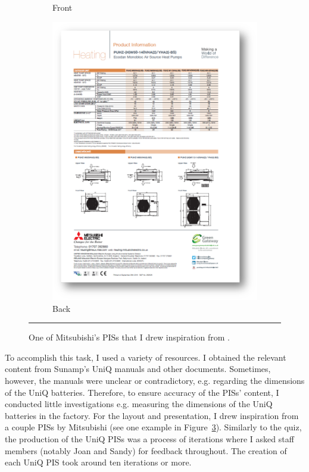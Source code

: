 \begin{figure}
\begin{subfigure}{.19\textwidth}
		\caption{Front}
		\label{mitsubishi01}
	\end{subfigure}
	\begin{subfigure}{.19\textwidth}
		\centering
		\includegraphics[width=\textwidth]{figures/Mitsubishi02.png}
		\caption{Back}
		\label{mitsubishi02}
	\end{subfigure}
	\rule{0.4\textwidth}{0.5pt} %
	\caption[Mitsubishi's PISs.]{One of Mitsubishi's PISs that I drew inspiration from \citep{ref:Mitsubishi}.}
	\label{mitsubishi}
\end{figure}

To accomplish this task, I used a variety of resources.
I obtained the relevant content from Sunamp's UniQ manuals and other documents.
Sometimes, however, the manuals were unclear or contradictory, e.g. regarding the dimensions of the UniQ batteries.
Therefore, to ensure accuracy of the PISs' content, I conducted little investigations e.g. measuring the dimensions of the UniQ batteries in the factory.
For the layout and presentation, I drew inspiration from a couple PISs by Mitsubishi (see one example in Figure~\ref{mitsubishi}).
Similarly to the quiz, the production of the UniQ PISs was a process of iterations where I asked staff members (notably Joan and Sandy) for feedback throughout.
The creation of each UniQ PIS took around ten iterations or more.



